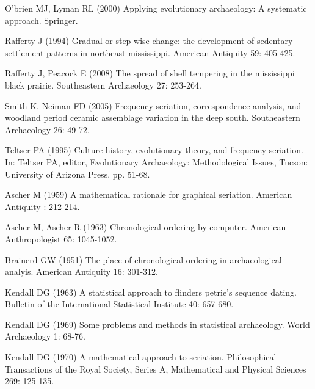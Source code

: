 \documentclass[10pt,letterpaper]{article}
\begin{document}
\begin{thebibliography}{10}
O'brien MJ, Lyman RL (2000) Applying evolutionary archaeology: A systematic
  approach.
\newblock Springer.

Rafferty J (1994) Gradual or step-wise change: the development of sedentary
  settlement patterns in northeast mississippi.
\newblock American Antiquity 59: 405-425.

Rafferty J, Peacock E (2008) The spread of shell tempering in the mississippi
  black prairie.
\newblock Southeastern Archaeology 27: 253-264.

Smith K, Neiman FD (2005) Frequency seriation, correspondence analysis, and
  woodland period ceramic assemblage variation in the deep south.
\newblock Southeastern Archaeology 26: 49-72.

Teltser PA (1995) Culture history, evolutionary theory, and frequency
  seriation.
\newblock In: Teltser PA, editor, Evolutionary Archaeology: Methodological
  Issues, Tucson: University of Arizona Press. pp. 51-68.

Ascher M (1959) A mathematical rationale for graphical seriation.
\newblock American Antiquity : 212-214.

Ascher M, Ascher R (1963) Chronological ordering by computer.
\newblock American Anthropologist 65: 1045-1052.

Brainerd GW (1951) The place of chronological ordering in archaeological
  analyis.
\newblock American Antiquity 16: 301-312.

Kendall DG (1963) A statistical approach to flinders petrie's sequence dating.
\newblock Bulletin of the International Statistical Institute 40: 657-680.

Kendall DG (1969) Some problems and methods in statistical archaeology.
\newblock World Archaeology 1: 68-76.

Kendall DG (1970) A mathematical approach to seriation.
\newblock Philosophical Transactions of the Royal Society, Series A,
  Mathematical and Physical Sciences 269: 125-135.


\end{thebibliography}
\end{document}
